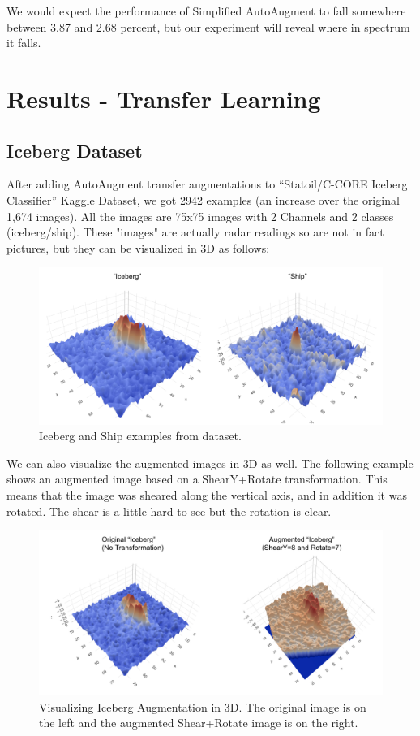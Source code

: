 \documentclass[10pt,twocolumn,letterpaper]{article}
\begin{document}
We would expect the performance of Simplified AutoAugment to fall somewhere between 3.87 and 2.68 percent, but our experiment will reveal where in spectrum it falls.


\section{Results - Transfer Learning}

\subsection{Iceberg Dataset}

After adding AutoAugment transfer augmentations to “Statoil/C-CORE Iceberg Classifier” Kaggle Dataset, we got 2942 examples (an increase over the original 1,674 images). All the images are 75x75 images with 2 Channels and 2 classes (iceberg/ship).  These "images" are actually radar readings so are not in fact pictures,  but they can be visualized in 3D as follows:

\begin{figure}[bhp]
\includegraphics[width=\columnwidth]{iceberg_ship_example.png}
\caption{Iceberg and Ship examples from dataset.}
\end{figure}

We can also visualize the augmented images in 3D as well.  The following example shows an augmented image based on a ShearY+Rotate transformation.  This means that the image was sheared along the vertical axis, and in addition it was rotated.  The shear is a little hard to see but the rotation is clear.

\begin{figure}[bhp]
\includegraphics[width=\columnwidth]{iceberg_aug_example.png}
\caption{Visualizing Iceberg Augmentation in 3D.  The original image is on the left and the augmented Shear+Rotate image is on the right.}
\end{figure}
\end{document}
